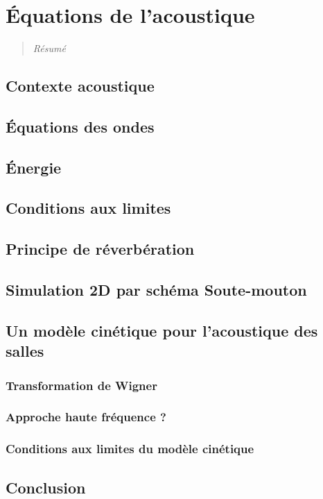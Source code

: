 \chapter{Équations de l'acoustique}
\label{chap:ch1}
\begin{quotation}
\textit{Résumé}
\end{quotation}
\minitoc
\newpage
 
  
\section{Contexte acoustique}
\section{Équations des ondes}
\section{Énergie}
\section{Conditions aux limites}
\section{Principe de réverbération}
\section{Simulation 2D par schéma Soute-mouton}
\section{Un modèle cinétique pour l'acoustique des salles}
\subsection{Transformation de Wigner}
\subsection{Approche haute fréquence ?}
\subsection{Conditions aux limites du modèle cinétique}
\section{Conclusion}
